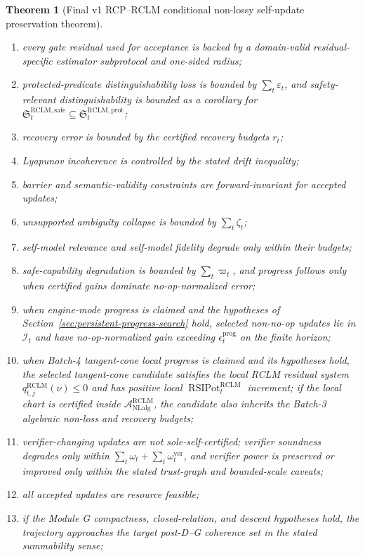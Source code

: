 \documentclass[11pt,a4paper]{article}
\newtheorem{theorem}{Theorem}[section]
\newcommand{\Acal}{\mathcal A}
\newcommand{\eps}{\varepsilon}
\newcommand{\RCLM}{\mathrm{RCLM}}
\newcommand{\safe}{\mathrm{safe}}
\newcommand{\ver}{\mathrm{ver}}
\newcommand{\prot}{\mathrm{prot}}
\newcommand{\NLalg}{\mathrm{NLalg}}
\newcommand{\RSIPot}{\operatorname{RSIPot}}
\begin{document}
\begin{theorem}[Final v1 RCP--RCLM conditional non-lossy self-update preservation theorem]
\begin{enumerate}[label=(\roman*),leftmargin=1.5em]
    \item every gate residual used for acceptance is backed by a domain-valid residual-specific estimator subprotocol and one-sided radius;
    \item protected-predicate distinguishability loss is bounded by \(\sum_t\eps_t\), and safety-relevant distinguishability is bounded as a corollary for \(\mathfrak S_t^{\RCLM,\safe}\subseteq\mathfrak S_t^{\RCLM,\prot}\);
    \item recovery error is bounded by the certified recovery budgets \(r_t\);
    \item Lyapunov incoherence is controlled by the stated drift inequality;
    \item barrier and semantic-validity constraints are forward-invariant for accepted updates;
    \item unsupported ambiguity collapse is bounded by \(\sum_t\zeta_t\);
    \item self-model relevance and self-model fidelity degrade only within their budgets;
    \item safe-capability degradation is bounded by \(\sum_t\varpi_t\), and progress follows only when certified gains dominate no-op-normalized error;
    \item when engine-mode progress is claimed and the hypotheses of Section~\ref{sec:persistent-progress-search} hold, selected non-no-op updates lie in \(\mathcal I_t\) and have no-op-normalized gain exceeding \(\epsilon_t^{\mathrm{prog}}\) on the finite horizon;
    \item when Batch-4 tangent-cone local progress is claimed and its hypotheses hold, the selected tangent-cone candidate satisfies the local RCLM residual system \(q_{t,j}^{\RCLM}(\nu)\le0\) and has positive local \(\RSIPot_t^{\RCLM}\) increment; if the local chart is certified inside \(\Acal_{\NLalg}^{\RCLM}\), the candidate also inherits the Batch-3 algebraic non-loss and recovery budgets;
    \item verifier-changing updates are not sole-self-certified; verifier soundness degrades only within \(\sum_t\omega_t+\sum_t\omega_t^{\ver}\), and verifier power is preserved or improved only within the stated trust-graph and bounded-scale caveats;
    \item all accepted updates are resource feasible;
    \item if the Module G compactness, closed-relation, and descent hypotheses hold, the trajectory approaches the target post-D--G coherence set in the stated summability sense;

\end{enumerate}
\end{theorem}
\end{document}
